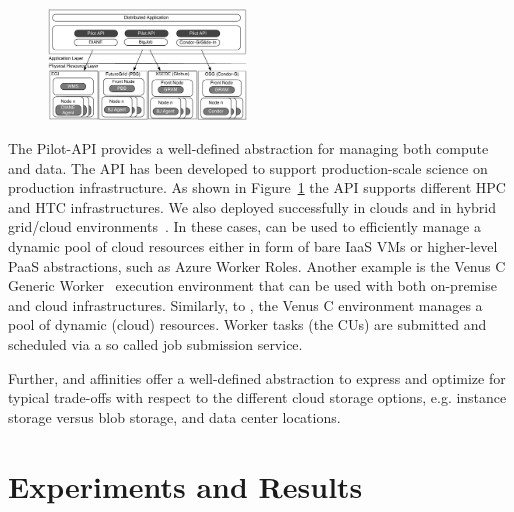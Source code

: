 \documentclass[conference]{IEEEtran}
\begin{document}
\begin{figure}[t]
    \begin{center}
\includegraphics[width=0.47\textwidth]{../figures/distributed_pilot_job.pdf}
    \caption{\label{fig:figures_distributed_pilot_job}}
	\upp\upp
  \end{center}    
\end{figure}

The Pilot-API provides a well-defined abstraction for managing both compute
and data. The API has been developed to support production-scale science on
production infrastructure. As shown in
Figure~\ref{fig:figures_distributed_pilot_job} the API supports different HPC
and HTC infrastructures. We also deployed \pilots
successfully in clouds and in hybrid grid/cloud 
environments~\cite{bigjob_cloudcom10,saga_bigjob_condor_cloud}. In these
cases, \pilots can be used to efficiently manage a dynamic pool of cloud
resources either in form of bare IaaS VMs or higher-level PaaS abstractions,
such as Azure Worker Roles. Another example 
is the Venus C Generic Worker~\cite{venusc-generic-worker} execution
environment that can be used with both on-premise and cloud infrastructures.
Similarly, to \pilots, the Venus C environment manages a pool of
dynamic (cloud) resources. Worker tasks (the CUs) are submitted and scheduled
via a so called job submission service.

Further, \pilotdata and affinities offer a
well-defined abstraction to express and optimize for typical trade-offs with
respect to the different cloud storage options, e.g. instance storage versus
blob storage, and data center locations.


\section{Experiments and Results}\label{sec:exp_res}
\end{document}
